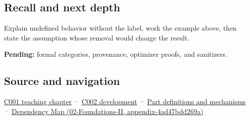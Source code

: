 \subsection{Recall and next depth}\label{appendix-f558f5b4d8f2-recall-and-next-depth}

Explain undefined behavior without the label, work the example above, then state the assumption whose removal would change the result.

\textbf{Pending:} formal categories, provenance, optimizer proofs, and sanitizers.

\subsection{Source and navigation}\label{appendix-f558f5b4d8f2-source-and-navigation}

\hyperref[01-foundations-i-ch001-from-a-signal-to-an-interpretation]{C001 teaching chapter} · \hyperref[01-foundations-i-ch001-arithmetic-becomes-a-policy]{C002 development} · \hyperref[appendix-fd090d982a15]{Part definitions and mechanisms} · \href{../02-Foundations-II/main.pdf\#nameddest=appendix-4ad47bdd269a}{Dependency Map (02-Foundations-II, appendix-4ad47bdd269a)}

